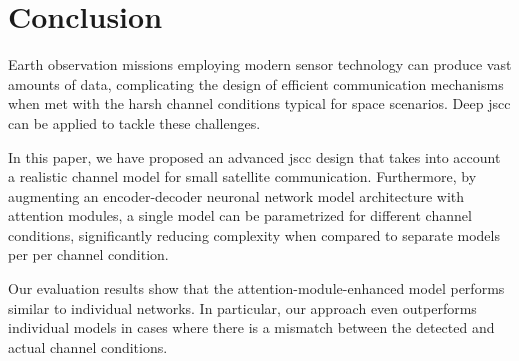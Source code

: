 \documentclass[conference]{IEEEtran}
\begin{document}
\section{Conclusion}
\label{sec:conclusion}

Earth observation missions employing modern sensor technology can produce vast amounts of data, complicating the design of efficient communication mechanisms when met with the harsh channel conditions typical for space scenarios.
Deep \Acf{jscc} can be applied to tackle these challenges.

In this paper, we have proposed an advanced \ac{jscc} design that takes into account a realistic channel model for small satellite communication.
Furthermore, by augmenting an encoder-decoder neuronal network model architecture with attention modules, a single model can be parametrized for different channel conditions, significantly reducing complexity when compared to separate models per per channel condition.

Our evaluation results show that the attention-module-enhanced model performs similar to individual networks.
In particular, our approach even outperforms individual models in cases where there is a mismatch between the detected and actual channel conditions.



\end{document}
